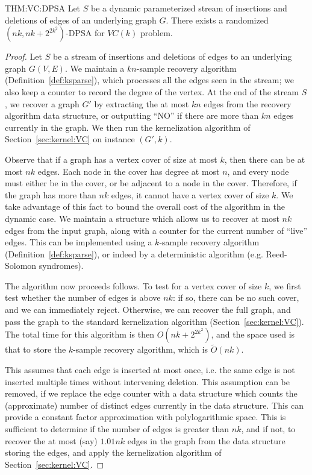 \documentclass[11pt,letter]{article}
\begin{document}
\begin{reptheorem}{THM:VC:DPSA}
Let $S$ be a dynamic parameterized stream of  insertions and deletions of edges of an underlying graph $G$.
There exists a randomized $(nk, nk+2^{2k^2})$-DPSA for $VC(k)$ problem.
\end{reptheorem}
\begin{proof}
Let $S$ be a stream of insertions and deletions of edges to an
underlying graph $G(V,E)$.
We maintain a
$kn$-sample recovery algorithm (Definition~\ref{def:ksparse}), which
processes all the edges seen in the stream; we also keep a counter
to record the degree of the vertex.
At the end of the stream $S$, we recover a graph $G'$ by extracting
the at most $kn$ edges from the recovery algorithm data structure, or
outputting ``NO'' if there are more than $kn$ edges currently in the
graph.
We then run the kernelization algorithm of Section~\ref{sec:kernel:VC}
on instance $(G', k)$.

Observe that if a graph has a vertex cover of
size at most $k$, then there can be at most $nk$ edges.
Each node in the cover has degree at most $n$, and every node must
either be in the cover, or be adjacent to a node in the cover.
Therefore, if the graph has more than $nk$ edges, it cannot have a
vertex cover of size $k$.
We take advantage of this fact to bound the overall cost of the
algorithm in the dynamic case.
We maintain a structure which allows us to recover at most $nk$ edges
from the input graph, along with a counter for the current number of
``live'' edges.
This can be implemented using a $k$-sample recovery algorithm
(Definition~\ref{def:ksparse}), or indeed by a deterministic algorithm
(e.g. Reed-Solomon syndromes).

The algorithm now proceeds follows.
To test for a vertex cover of size $k$, we first test whether the
number of edges is above $nk$: if so, there can be no such cover, and
we can immediately reject.
Otherwise, we can recover the full graph, and pass the graph to the
standard kernelization algorithm (Section~\ref{sec:kernel:VC}).
The total time for this algorithm is then $O(nk + 2^{2k^2})$, and the
space used is that to store the $k$-sample recovery algorithm, which
is $\tilde{O}(nk)$.

This assumes that each edge is inserted at most once, i.e. the same
edge is not inserted multiple times without intervening deletion.
This assumption can be removed, if we replace the edge counter with a
data structure which counts the (approximate) number of distinct edges
currently in the data structure.
This can provide a constant factor approximation with polylogarithmic
space.
This is sufficient to determine if the number of edges is greater than
$nk$, and if not, to recover the at most (say) $1.01nk$ edges in
the graph from the data structure storing the edges, and apply the kernelization algorithm of Section~\ref{sec:kernel:VC}.
\end{proof}
\end{document}
